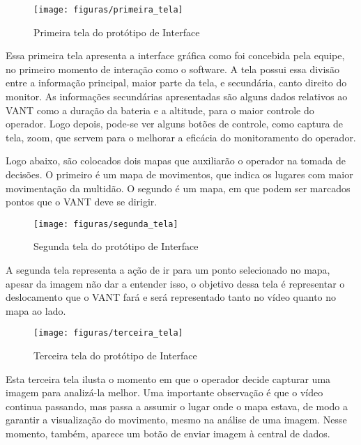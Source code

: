 \begin{figure}[H]
\centering\texttt{[image: figuras/primeira\_tela]}
\caption{Primeira tela do protótipo de Interface}
\end{figure}

Essa primeira tela apresenta a interface gráfica como foi concebida pela equipe, no primeiro momento de interação como o software. A tela possui essa divisão entre a informação principal, maior parte da tela, e secundária, canto direito do monitor. As informações secundárias apresentadas são alguns dados relativos ao VANT como a duração da bateria e a altitude, para o maior controle do operador. Logo depois, pode-se ver alguns botões de controle, como captura de tela, zoom, que servem para o melhorar a eficácia do monitoramento do operador.

Logo abaixo, são colocados dois mapas que auxiliarão o operador na tomada de decisões. O primeiro é um mapa de movimentos, que indica os lugares com maior movimentação da multidão. O segundo é um mapa, em que podem ser marcados pontos que o VANT deve se dirigir.

\begin{figure}[H]
\centering\texttt{[image: figuras/segunda\_tela]}
\caption{Segunda tela do protótipo de Interface}
\end{figure}
A segunda tela representa a ação de ir para um ponto selecionado no mapa, apesar da imagem não dar a entender isso, o objetivo dessa tela é representar o deslocamento que o VANT fará e será representado tanto no vídeo quanto no mapa ao lado.

\begin{figure}[H]
\centering\texttt{[image: figuras/terceira\_tela]}
\caption{Terceira tela do protótipo de Interface}
\end{figure}
Esta terceira tela ilusta o momento em que o operador decide capturar uma imagem para analizá-la melhor. Uma importante observação é que o vídeo continua passando, mas passa a assumir o lugar onde o mapa estava, de modo a garantir a visualização do movimento, mesmo na análise de uma imagem. Nesse momento, também, aparece um botão de enviar imagem à central de dados.
